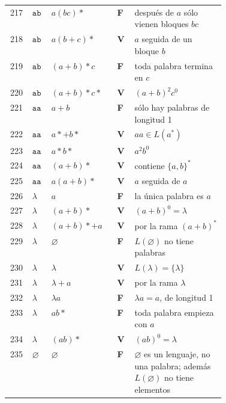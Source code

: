 \documentclass[11pt]{article}
\begin{document}
\begin{center}
\begin{longtable}{clllp{0.42\linewidth}}
217 & $\texttt{ab}$ & $a(bc)*$ & \textbf{F} & después de $a$ sólo vienen bloques $bc$ \\
218 & $\texttt{ab}$ & $a(b + c)*$ & \textbf{V} & $a$ seguida de un bloque $b$ \\
219 & $\texttt{ab}$ & $(a + b)*c$ & \textbf{F} & toda palabra termina en $c$ \\
220 & $\texttt{ab}$ & $(a + b)*c*$ & \textbf{V} & $(a+b)^2 c^0$ \\
221 & $\texttt{aa}$ & $a + b$ & \textbf{F} & sólo hay palabras de longitud 1 \\
222 & $\texttt{aa}$ & $a* + b*$ & \textbf{V} & $aa \in L(a^*)$ \\
223 & $\texttt{aa}$ & $a*b*$ & \textbf{V} & $a^2 b^0$ \\
224 & $\texttt{aa}$ & $(a + b)*$ & \textbf{V} & contiene $\{a,b\}^*$ \\
225 & $\texttt{aa}$ & $a(a + b)*$ & \textbf{V} & $a$ seguida de $a$ \\
226 & $\lambda$ & $a$ & \textbf{F} & la única palabra es $a$ \\
227 & $\lambda$ & $(a + b)*$ & \textbf{V} & $(a+b)^0 = \lambda$ \\
228 & $\lambda$ & $(a + b)* + a$ & \textbf{V} & por la rama $(a+b)^*$ \\
229 & $\lambda$ & $\varnothing $ & \textbf{F} & $L(\varnothing)$ no tiene palabras \\
230 & $\lambda$ & $\lambda $ & \textbf{V} & $L(\lambda) = \{\lambda\}$ \\
231 & $\lambda$ & $\lambda  + a$ & \textbf{V} & por la rama $\lambda$ \\
232 & $\lambda$ & $\lambda a$ & \textbf{F} & $\lambda a = a$, de longitud 1 \\
233 & $\lambda$ & $ab*$ & \textbf{F} & toda palabra empieza con $a$ \\
234 & $\lambda$ & $(ab)*$ & \textbf{V} & $(ab)^0 = \lambda$ \\
235 & $\varnothing$ & $\varnothing$ & \textbf{F} & $\varnothing$ es un lenguaje, no una palabra; además $L(\varnothing)$ no tiene elementos \\
\bottomrule\end{longtable}\end{center}
\end{document}
